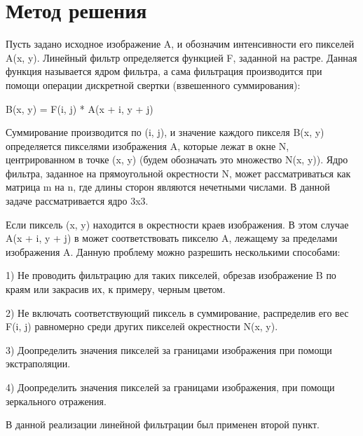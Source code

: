 \documentclass{report}
\begin{document}
\section*{Метод решения}
Пусть задано исходное изображение A, и обозначим интенсивности его пикселей A(x, y). Линейный фильтр определяется функцией F, заданной на растре. Данная функция называется ядром фильтра, а сама фильтрация производится при помощи операции дискретной свертки (взвешенного суммирования): 
\par
B(x, y) =  F(i, j) * A(x + i, y + j)
\par
Суммирование производится по (i, j), и значение каждого пикселя B(x, y) определяется пикселями изображения A, которые лежат в окне N, центрированном в точке (x, y) (будем обозначать это множество N(x, y)). Ядро фильтра, заданное на прямоугольной окрестности N, может рассматриваться как матрица m на n, где длины сторон являются нечетными числами. В данной задаче рассматривается ядро 3x3.
\par 
Если пиксель (x, y) находится в окрестности краев изображения. В этом случае                 A(x + i, y + j) в может соответствовать пикселю A, лежащему за пределами изображения A. Данную проблему можно разрешить несколькими способами:
\par 
1) Не проводить фильтрацию для таких пикселей, обрезав изображение B по краям или закрасив их, к примеру, черным цветом. 
\par 
2) Не включать соответствующий пиксель в суммирование, распределив его вес F(i, j) равномерно среди других пикселей окрестности N(x, y). 
\par 
3) Доопределить значения пикселей за границами изображения при помощи экстраполяции.
\par
4) Доопределить значения пикселей за границами изображения, при помощи зеркального отражения.
\par
В данной реализации линейной фильтрации был применен второй пункт.
\newpage

\end{document}
